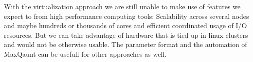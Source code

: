 With the virtualization approach we are still unable to make use of features
we expect to from high performance computing tools: Scalability across
several nodes and maybe hundreds or thousands of cores and efficient
coordinated usage of I/O resources.  But we can take advantage of hardware
that is tied up in linux clusters and would not be otherwise usable. The
parameter format and the automation of MaxQaunt can be usefull for other
approaches as well.
